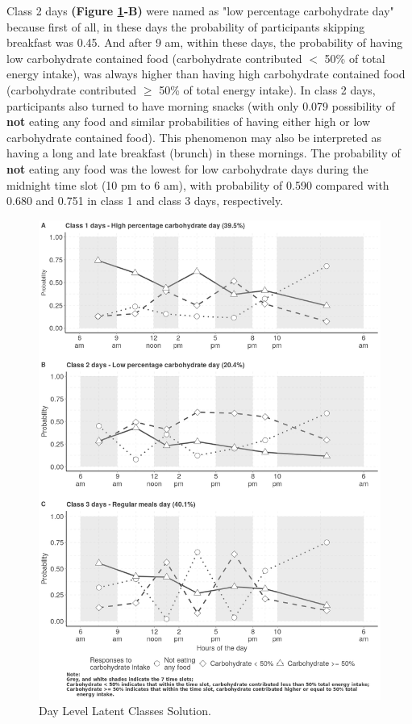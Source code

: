 Class 2 days \textbf{(Figure \ref{fig:level1}-B)} were named as "low percentage carbohydrate day" because first of all, in these days the probability of participants skipping breakfast was 0.45. And after 9 am, within these days, the probability of having low carbohydrate contained food (carbohydrate contributed $<$ 50\% of total energy intake), was always higher than having high carbohydrate contained food (carbohydrate contributed $\geqslant$ 50\% of total energy intake). In class 2 days, participants also turned to have morning snacks (with only 0.079 possibility of \textbf{not} eating any food and similar probabilities of having either high or low carbohydrate contained food). This phenomenon may also be interpreted as having a long and late breakfast (brunch) in these mornings. The probability of \textbf{not} eating any food was the lowest for low carbohydrate days during the midnight time slot (10 pm to 6 am), with probability of 0.590 compared with 0.680 and 0.751 in class 1 and class 3 days, respectively. 





\begin{figure}[H]
	\centering
	\includegraphics[width=13cm]{Figures/level1.png}
	\decoRule
	\caption[Day Level Latent Class Solution.]{Day Level Latent Classes Solution.}
	\label{fig:level1}
\end{figure}
\vspace{-0.6cm}

